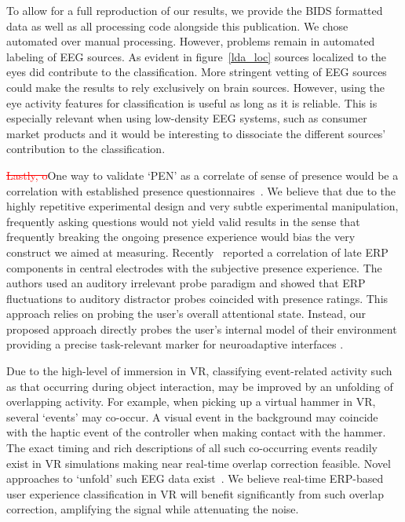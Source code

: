 To allow for a full reproduction of our results, we provide the BIDS formatted data as well as all processing code alongside this publication. We chose automated over manual processing. However, problems remain in automated labeling of EEG sources. As evident in figure~\ref{lda_loc} sources localized to the eyes did contribute to the classification. More stringent vetting of EEG sources could make the results to rely exclusively on brain sources. However, using the eye activity features for classification is useful as long as it is reliable. This is especially relevant when using low-density EEG systems, such as consumer market products and it would be interesting to dissociate the different sources' contribution to the classification.

\textcolor{red}{\st{Lastly, o}}One way to validate `PEN' as a correlate of sense of presence would be a correlation with established presence questionnaires~\cite{Witmer1998-ew,Schubert2003-sq}. We believe that due to the highly repetitive experimental design and very subtle experimental manipulation, frequently asking questions would not yield valid results in the sense that frequently breaking the ongoing presence experience would bias the very construct we aimed at measuring. Recently~\cite{Grassini2021-tc} reported a correlation of late ERP components in central electrodes with the subjective presence experience. The authors used an auditory irrelevant probe paradigm and showed that ERP fluctuations to auditory distractor probes coincided with presence ratings. This approach relies on probing the user's overall attentional state. Instead, our proposed approach directly probes the user's internal model of their environment providing a precise task-relevant marker for neuroadaptive interfaces \cite{Krol2020-lj}.

\textcolor{n}{Due to the high-level of immersion in VR, classifying event-related activity such as that occurring during object interaction, may be improved by an unfolding of overlapping activity. For example, when picking up a virtual hammer in VR, several `events' may co-occur. A visual event in the background may coincide with the haptic event of the controller when making contact with the hammer. The exact timing and rich descriptions of all such co-occurring events readily exist in VR simulations making near real-time overlap correction feasible. Novel approaches to `unfold' such EEG data exist~\cite{Ehinger2019-in}. We believe real-time ERP-based user experience classification in VR will benefit significantly from such overlap correction, amplifying the signal while attenuating the noise.}

